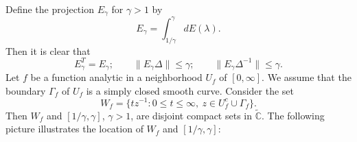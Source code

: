 \documentclass[12pt,b5paper,twoside]{article}
\theoremstyle{takesaki}
\numberwithin{equation}{section}
\begin{document}
Define the projection $E_\gamma$ for $\gamma>1$ by
\begin{equation}
  E_\gamma=\int_{1/\gamma}^{\gamma}dE(\lambda).
  \tag{8.9}\label{eq:8.9}
\end{equation}
Then it is clear that
\begin{equation}
  E_\gamma^T=E_\gamma;
  \qquad \|E_\gamma\Delta\|\leq\gamma;
  \qquad \|E_\gamma\Delta^{-1}\|\leq\gamma.
  \tag{8.10}\label{eq:8.10}
\end{equation}
Let $f$ be a function analytic in a neighborhood $U_f$ of
$[0,\infty]$.  We assume that the boundary $\Gamma_f$ of $U_f$ is a
simply closed smooth curve.  Consider the set
\begin{equation}
  W_f=\{tz^{-1}:0\leq t\leq\infty,
  \ z\in U_f^c\cup\Gamma_f\}.
  \tag{8.11}\label{eq:8.11}
\end{equation}
Then $W_f$ and $[1/\gamma,\gamma]$, $\gamma>1$, are disjoint compact
sets in $\widetilde{\mathbb C}$.  The following picture illustrates
the location of $W_f$ and $[1/\gamma,\gamma]$:
\end{document}
